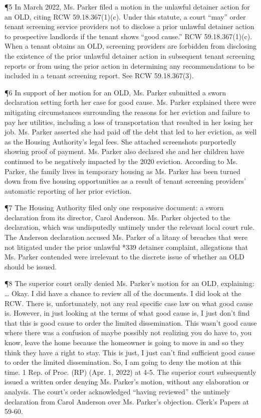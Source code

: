 \documentclass[11pt]{article}
\begin{document}
¶5 In March 2022, Ms. Parker filed a motion in the unlawful detainer action for an OLD, citing RCW 59.18.367(1)(c). Under this statute, a court “may” order tenant screening service providers not to disclose a prior unlawful detainer action to prospective landlords if the tenant shows “good cause.” RCW 59.18.367(1)(c). When a tenant obtains an OLD, screening providers are forbidden from disclosing the existence of the prior unlawful detainer action in subsequent tenant screening reports or from using the prior action in determining any recommendations to be included in a tenant screening report. See RCW 59.18.367(3).

¶6 In support of her motion for an OLD, Ms. Parker submitted a sworn declaration setting forth her case for good cause. Ms. Parker explained there were mitigating circumstances surrounding the reasons for her eviction and failure to pay her utilities, including a loss of transportation that resulted in her losing her job. Ms. Parker asserted she had paid off the debt that led to her eviction, as well as the Housing Authority’s legal fees. She attached screenshots purportedly showing proof of payment. Ms. Parker also declared she and her children have continued to be negatively impacted by the 2020 eviction. According to Ms. Parker, the family lives in temporary housing as Ms. Parker has been turned down from five housing opportunities as a result of tenant screening providers’ automatic reporting of her prior eviction.

¶7 The Housing Authority filed only one responsive document: a sworn declaration from its director, Carol Anderson. Ms. Parker objected to the declaration, which was undisputedly untimely under the relevant local court rule. The Anderson declaration accused Ms. Parker of a litany of breaches that were not litigated under the prior unlawful *339 detainer complaint, allegations that Ms. Parker contended were irrelevant to the discrete issue of whether an OLD should be issued.

¶8 The superior court orally denied Ms. Parker’s motion for an OLD, explaining:
\ldots{} Okay. I did have a chance to review all of the documents. I did look at the RCW. There is, unfortunately, not any real specific case law on what good cause is. However, in just looking at the terms of what good cause is, I just don’t find that this is good cause to order the limited dissemination.
This wasn’t good cause where there was a confusion of maybe possibly not realizing you do have to, you know, leave the home because the homeowner is going to move in and so they think they have a right to stay. This is just, I just can’t find sufficient good cause to order the limited dissemination. So, I am going to deny the motion at this time.
1 Rep. of Proc. (RP) (Apr. 1, 2022) at 4-5. The superior court subsequently issued a written order denying Ms. Parker’s motion, without any elaboration or analysis. The court’s order acknowledged “having reviewed” the untimely declaration from Carol Anderson over Ms. Parker’s objection. Clerk’s Papers at 59-60.
\end{document}

